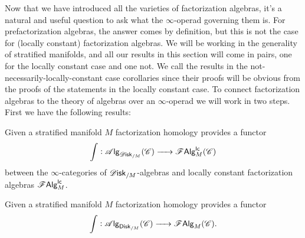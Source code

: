\documentclass[../text]{subfiles}
\begin{document}
Now that we have introduced all the varieties of factorization algebras, it's a natural and useful question to ask what the $\infty$-operad governing them is. For prefactorization algebras, the answer comes by definition, but this is not the case for (locally constant) factorization algebras. We will be working in the generality of stratified manifolds, and all our results in this section will come in pairs, one for the locally constant case and one not. We call the results in the not-necessarily-locally-constant case corollaries since their proofs will be obvious from the proofs of the statements in the locally constant case. To connect factorization algebras to the theory of algebras over an $\infty$-operad we will work in two steps. First we have the following results:
%
\begin{proposition}\label{prop:fh_disk_to_lcfa}
    Given a stratified manifold $M$ factorization homology provides a functor
    \begin{equation}
        \int : \alg{\disk_{/M}} (\catC) \xrightarrow{\ \ \ \ } \lcfa_M (\catC)
    \end{equation}
    between the $\infty$-categories of $\disk_{/M}$-algebras and locally constant factorization algebras $\mathscr{F} \mathsf{Alg}^{\mathsf{lc}}_M$.
\end{proposition}
%
\begin{corollary}\label{cor:fh_disk_to_falg}
    Given a stratified manifold $M$ factorization homology provides a functor
    \begin{equation}
        \int: \alg{\disk[r]_{/M}} (\catC) \xrightarrow{\ \ \ \ } \falg_{M} (\catC).
    \end{equation}
\end{corollary}
\end{document}
